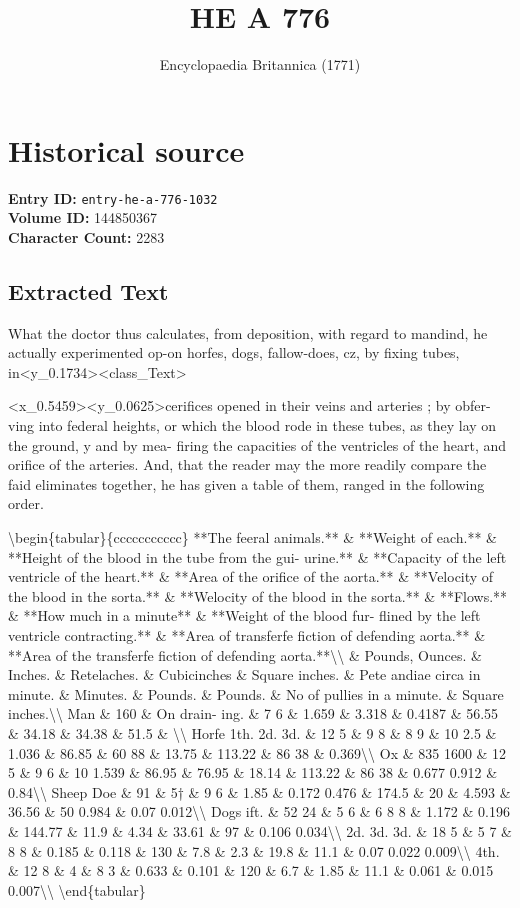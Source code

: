 \documentclass{article}
\title{HE A  776}
\date{Encyclopaedia Britannica (1771)}
\begin{document}
\maketitle

\section*{Historical source}
\textbf{Entry ID:} \texttt{entry-he-a-776-1032} \\
\textbf{Volume ID:} 144850367 \\
\textbf{Character Count:} 2283

\subsection*{Extracted Text}
What the doctor thus calculates, from deposition, with regard to mandind, he actually experimented op-on horfes, dogs, fallow-does, cz, by fixing tubes, in<y\_0.1734><class\_Text>

<x\_0.5459><y\_0.0625>cerifices opened in their veins and arteries ; by obfer-ving into federal heights, or which the blood rode in these tubes, as they lay on the ground, y and by mea- firing the capacities of the ventricles of the heart, and orifice of the arteries. And, that the reader may the more readily compare the faid eliminates together, he has given a table of them, ranged in the following order.

\textbackslash{}begin\{tabular\}\{ccccccccccc\}
**The feeral animals.** \& **Weight of each.** \& **Height of the blood in the tube from the gui- urine.** \& **Capacity of the left ventricle of the heart.** \& **Area of the orifice of the aorta.** \& **Velocity of the blood in the sorta.** \& **Welocity of the blood in the sorta.** \& **Flows.** \& **How much in a minute** \& **Weight of the blood fur- flined by the left ventricle contracting.** \& **Area of transferfe fiction of defending aorta.** \& **Area of the transferfe fiction of defending aorta.**\textbackslash{}\textbackslash{}
 \& Pounds, Ounces. \& Inches. \& Retelaches. \& Cubicinches \& Square inches. \& Pete andiae circa in minute. \& Minutes. \& Pounds. \& Pounds. \& No of pullies in a minute. \& Square inches.\textbackslash{}\textbackslash{}
Man \& 160 \& On drain- ing. \& 7 6 \& 1.659 \& 3.318 \& 0.4187 \& 56.55 \& 34.18 \& 34.38 \& 51.5 \& \textbackslash{}\textbackslash{}
Horfe 1th. 2d. 3d. \& 12 5 \& 9 8 \& 8 9 \& 10 2.5 \& 1.036 \& 86.85 \& 60 88 \& 13.75 \& 113.22 \& 86 38 \& 0.369\textbackslash{}\textbackslash{}
Ox \& 835 1600 \& 12 5 \& 9 6 \& 10 1.539 \& 86.95 \& 76.95 \& 18.14 \& 113.22 \& 86 38 \& 0.677 0.912 \& 0.84\textbackslash{}\textbackslash{}
Sheep Doe \& 91 \& 5† \& 9 6 \& 1.85 \& 0.172 0.476 \& 174.5 \& 20 \& 4.593 \& 36.56 \& 50 0.984 \& 0.07 0.012\textbackslash{}\textbackslash{}
Dogs ift. \& 52 24 \& 5 6 \& 6 8 8 \& 1.172 \& 0.196 \& 144.77 \& 11.9 \& 4.34 \& 33.61 \& 97 \& 0.106 0.034\textbackslash{}\textbackslash{}
2d. 3d. 3d. \& 18 5 \& 5 7 \& 8 8 \& 0.185 \& 0.118 \& 130 \& 7.8 \& 2.3 \& 19.8 \& 11.1 \& 0.07 0.022 0.009\textbackslash{}\textbackslash{}
4th. \& 12 8 \& 4 \& 8 3 \& 0.633 \& 0.101 \& 120 \& 6.7 \& 1.85 \& 11.1 \& 0.061 \& 0.015 0.007\textbackslash{}\textbackslash{}
\textbackslash{}end\{tabular\}
\end{document}
